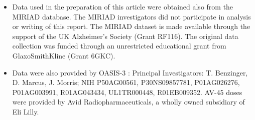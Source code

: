 \begin{itemize}
\item Data used in the preparation of this article were obtained also from the MIRIAD database.
The MIRIAD investigators did not participate in analysis or writing of this report.
The MIRIAD dataset is made available through the support of the UK Alzheimer's Society (Grant RF116).
The original data collection was funded through an unrestricted educational grant from GlaxoSmithKline (Grant 6GKC).
\item Data were also provided by OASIS-3 \citep{oasis3}: Principal Investigators: T. Benzinger, D. Marcus, J. Morris; NIH P50AG00561, P30NS09857781, P01AG026276, P01AG003991, R01AG043434, UL1TR000448, R01EB009352. AV-45 doses were provided by Avid Radiopharmaceuticals, a wholly owned subsidiary of Eli Lilly.
\end{itemize}

